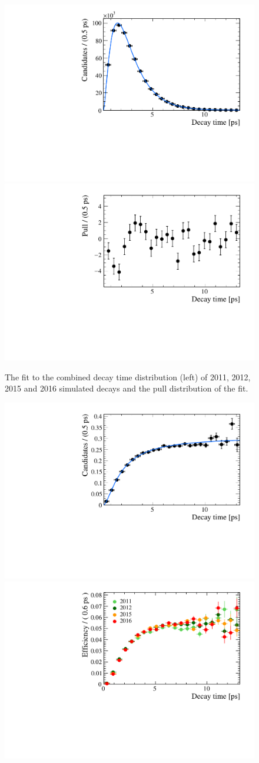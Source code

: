 {\begin{figure}[htbp]
    \centering
        \includegraphics[width= 0.49 \textwidth]{./Figs/LifetimeMeasurement/Bs2MuMu_Acceptance_fit.pdf}
        \includegraphics[width= 0.49 \textwidth]{./Figs/LifetimeMeasurement/Bs2MuMu_Accetpance_pull.pdf}
    \caption{The \ml fit to the combined decay time distribution (left) of 2011, 2012, 2015 and 2016 simulated \bsmumu decays and the pull distribution of the fit. }
    \label{fig:accptfit}
\end{figure}


\begin{figure}[htbp]
    \centering
        \includegraphics[width= 0.7 \textwidth]{./Figs/LifetimeMeasurement/Bs2MuMu_Acceptance_plot.pdf}
        \includegraphics[width= 0.7 \textwidth]{./Figs/LifetimeMeasurement/Acceptance_per_year.pdf}


\end{figure}}
